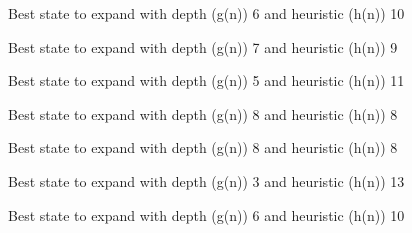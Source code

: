 \documentclass{article}
\begin{document}
{\noindent Best state to expand with depth (g(n)) 6 and heuristic (h(n)) 10\newline}
{}\newline

{\noindent Best state to expand with depth (g(n)) 7 and heuristic (h(n)) 9\newline}
{}\newline

{\noindent Best state to expand with depth (g(n)) 5 and heuristic (h(n)) 11\newline}
{}\newline

{\noindent Best state to expand with depth (g(n)) 8 and heuristic (h(n)) 8\newline}
{}\newline

{\noindent Best state to expand with depth (g(n)) 8 and heuristic (h(n)) 8\newline}
{}\newline

{\noindent Best state to expand with depth (g(n)) 3 and heuristic (h(n)) 13\newline}
{}\newline

{\noindent Best state to expand with depth (g(n)) 6 and heuristic (h(n)) 10\newline}
{}\newline
\end{document}
